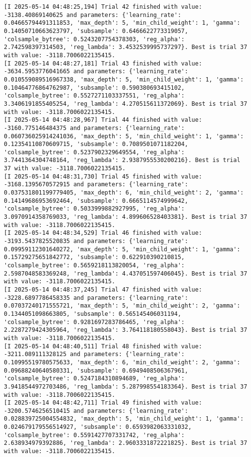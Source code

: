 \documentclass[
  letterpaper,
  DIV=11,
  numbers=noendperiod]{scrreprt}
\begin{document}
\begin{verbatim}
[I 2025-05-14 04:48:25,194] Trial 42 finished with value: -3138.40869140625 and parameters: {'learning_rate': 0.04665794491311853, 'max_depth': 5, 'min_child_weight': 1, 'gamma': 0.14050710663623797, 'subsample': 0.6466622773319057, 'colsample_bytree': 0.5243207754378303, 'reg_alpha': 2.742598397314503, 'reg_lambda': 3.4532539995737297}. Best is trial 37 with value: -3118.7006022135415.
[I 2025-05-14 04:48:27,181] Trial 43 finished with value: -3634.5953776041665 and parameters: {'learning_rate': 0.010559089516967338, 'max_depth': 5, 'min_child_weight': 1, 'gamma': 0.10464776864762987, 'subsample': 0.590380693415102, 'colsample_bytree': 0.5527271103337551, 'reg_alpha': 3.3406191855405254, 'reg_lambda': 4.270515611372069}. Best is trial 37 with value: -3118.7006022135415.
[I 2025-05-14 04:48:28,967] Trial 44 finished with value: -3160.775146484375 and parameters: {'learning_rate': 0.060736025914241036, 'max_depth': 5, 'min_child_weight': 1, 'gamma': 0.12354110870609715, 'subsample': 0.7089501071182204, 'colsample_bytree': 0.5237902329649554, 'reg_alpha': 3.7441364304748164, 'reg_lambda': 2.9387955530200216}. Best is trial 37 with value: -3118.7006022135415.
[I 2025-05-14 04:48:31,730] Trial 45 finished with value: -3168.1395670572915 and parameters: {'learning_rate': 0.037531801199779405, 'max_depth': 6, 'min_child_weight': 2, 'gamma': 0.14149686953692464, 'subsample': 0.6665114574999642, 'colsample_bytree': 0.5033999882927995, 'reg_alpha': 3.0970914358769033, 'reg_lambda': 4.899606528403381}. Best is trial 37 with value: -3118.7006022135415.
[I 2025-05-14 04:48:34,529] Trial 46 finished with value: -3193.5437825520835 and parameters: {'learning_rate': 0.09959112301640272, 'max_depth': 5, 'min_child_weight': 1, 'gamma': 0.15729275651842772, 'subsample': 0.622910390210815, 'colsample_bytree': 0.5659218113820054, 'reg_alpha': 2.5987048583369248, 'reg_lambda': 4.437051597406045}. Best is trial 37 with value: -3118.7006022135415.
[I 2025-05-14 04:48:37,245] Trial 47 finished with value: -3228.6897786458335 and parameters: {'learning_rate': 0.07037240171555721, 'max_depth': 5, 'min_child_weight': 2, 'gamma': 0.1344051098663805, 'subsample': 0.565145406031194, 'colsample_bytree': 0.9281697283786465, 'reg_alpha': 2.2287279424305964, 'reg_lambda': 3.764118180558043}. Best is trial 37 with value: -3118.7006022135415.
[I 2025-05-14 04:48:40,511] Trial 48 finished with value: -3211.089111328125 and parameters: {'learning_rate': 0.10995519780575633, 'max_depth': 6, 'min_child_weight': 2, 'gamma': 0.09688240640580331, 'subsample': 0.6949408506367961, 'colsample_bytree': 0.5247184310894689, 'reg_alpha': 3.9418544972703486, 'reg_lambda': 5.287998554183364}. Best is trial 37 with value: -3118.7006022135415.
[I 2025-05-14 04:48:42,711] Trial 49 finished with value: -3200.5746256510415 and parameters: {'learning_rate': 0.028839725004554832, 'max_depth': 5, 'min_child_weight': 1, 'gamma': 0.024679179556514927, 'subsample': 0.6593982063331032, 'colsample_bytree': 0.5591427707331742, 'reg_alpha': 2.638934979392886, 'reg_lambda': 2.9603331872221825}. Best is trial 37 with value: -3118.7006022135415.
\end{verbatim}
\end{document}

